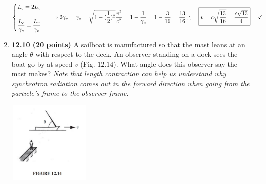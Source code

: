 \documentclass[fleqn]{article}
\begin{document}
\begin{enumerate}
      \textcolor{hwColor}{
        \\
        $
          \begin{cases}
            L_c=2 L_v
            \\
            \\
            \dfrac{L_c}{\gamma_c}=\dfrac{L_v}{\gamma_v}
          \end{cases}
          \Longrightarrow 2 \gamma_v=\gamma_c=\sqrt{1-(\dfrac{1}{2})^2}
          \\
          \\
          \\
          \dfrac{v^2}{c^2}=1-\dfrac{1}{\gamma_c}
          =1-\dfrac{3}{16}=\dfrac{13}{16}
          \\
          \\
          \\
          \therefore ~~~ \boxed{
            v=c \sqrt{\dfrac{13}{16}}=\dfrac{c \sqrt{13}}{4}
          } ~~~~ \checkmark
          \\
          \\
        $
      }

    \item \textbf{12.10 (20 points)} A sailboat is manufactured so that the mast leans at an angle $\bar{\theta}$ with
    respect to the deck. An observer standing on a dock sees the boat go by at speed $v$
    (Fig. $12.14$). What angle does this observer say the mast makes?
    \emph{Note that length contraction can help us understand why synchrotron radiation comes out in the 
    forward direction when going from the particle's frame to the observer frame.}
    \begin{center}
      \includegraphics[height=4cm, width=4cm]{1214.JPG}
    \end{center}


\end{enumerate}
\end{document}
